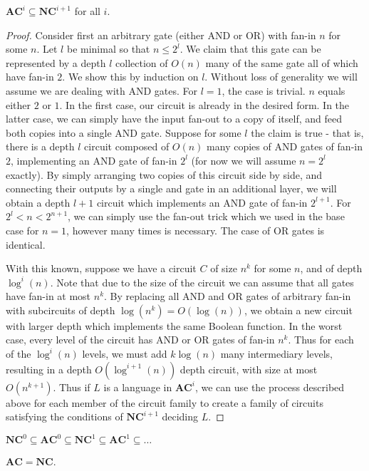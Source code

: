 \begin{fact}
	$\bm{AC}^i \subseteq \bm{NC}^{i+1}$ for all $i$.
\end{fact}
\begin{proof}
	Consider first an arbitrary gate (either AND or OR) with fan-in $n$ for some $n$. Let $l$ be minimal so that $n \leq 2^l$. We claim that this gate can be represented by a depth $l$ collection of $O(n)$ many of the same gate all of which have fan-in $2$. We show this by induction on $l$. Without loss of generality we will assume we are dealing with AND gates. For $l=1$, the case is trivial. $n$ equals either $2$ or $1$. In the first case, our circuit is already in the desired form. In the latter case, we can simply have the input fan-out to a copy of itself, and feed both copies into a single AND gate. Suppose for some $l$ the claim is true - that is, there is a depth $l$ circuit composed of $O(n)$ many copies of AND gates of fan-in $2$, implementing an AND gate of fan-in $2^l$ (for now we will assume $n = 2^l$ exactly). By simply arranging two copies of this circuit side by side, and connecting their outputs by a single and gate in an additional layer, we will obtain a depth $l+1$ circuit which implements an AND gate of fan-in $2^{l+1}$. For $2^l < n < 2^{n+1}$, we can simply use the fan-out trick which we used in the base case for $n=1$, however many times is necessary. The case of OR gates is identical. \par 
	With this known, suppose we have a circuit $C$ of size $n^k$ for some $n$, and of depth $\log^i(n)$. Note that due to the size of the circuit we can assume that all gates have fan-in at most $n^k$. By replacing all AND and OR gates of arbitrary fan-in with subcircuits of depth $\log(n^k) = O(\log(n))$, we obtain a new circuit with larger depth which implements the same Boolean function. In the worst case, every level of the circuit has AND or OR gates of fan-in $n^k$. Thus for each of the $\log^i(n)$ levels, we must add $k\log(n)$ many intermediary levels, resulting in a depth $O(\log^{i+1}(n))$ depth circuit, with size at most $O(n^{k+1})$. Thus if $L$ is a language in $\bm{AC}^i$, we can use the process described above for each member of the circuit family to create a family of circuits satisfying the conditions of $\bm{NC}^{i+1}$ deciding $L$. 
\end{proof}
\begin{corollary}
	$\bm{NC}^0 \subseteq \bm{AC}^0 \subseteq \bm{NC}^1 \subseteq \bm{AC}^1 \subseteq \ldots$
\end{corollary}
\begin{corollary}
	$\bm{AC} = \bm{NC}$.
\end{corollary}
